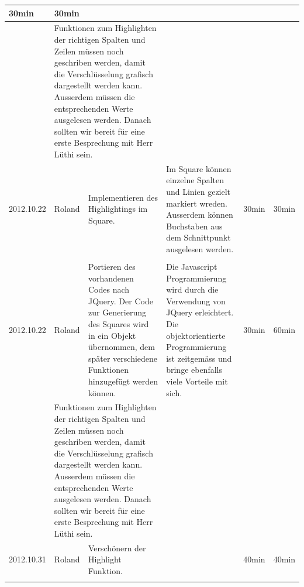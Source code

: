 \documentclass[11pt,paper=a4,final]{scrartcl}
\begin{document}
\begin{landscape}
\begin{longtable}{|p{1.8cm}|p{1.5cm}|p{5.0cm}|p{11.0cm}|l|l|}
    30min & 30min \\ \hline \nopagebreak
    \multicolumn{2}{|l|}{\bf Pendenzen} &\multicolumn{2}{p{16.0cm}|}{Funktionen zum Highlighten der richtigen Spalten und Zeilen m\"ussen noch geschriben werden, damit die Verschl\"usselung grafisch dargestellt werden kann. Ausserdem m\"ussen die entsprechenden Werte ausgelesen werden. Danach sollten wir bereit f\"ur eine erste Besprechung mit Herr L\"uthi sein.}  & \multicolumn{2}{l|}{} \\ \hline
    \hline
    2012.10.22 & Roland &
    Implementieren des Highlightings im Square.&
    Im Square k\"onnen einzelne Spalten und Linien gezielt markiert wreden. Ausserdem k\"onnen Buchstaben aus dem Schnittpunkt ausgelesen werden.&
    30min & 30min \\ \hline \nopagebreak
    \multicolumn{2}{|l|}{\bf Pendenzen} &\multicolumn{2}{p{16.0cm}|}{}  & \multicolumn{2}{l|}{} \\ \hline
    \hline
    2012.10.22 & Roland &
    Portieren des vorhandenen Codes nach JQuery. Der Code zur Generierung des Squares wird in ein Objekt \"ubernommen, dem sp\"ater verschiedene Funktionen hinzugef\"ugt werden k\"onnen.&
    Die Javascript Programmierung wird durch die Verwendung von JQuery erleichtert. Die objektorientierte Programmierung ist zeitgem\"ass und bringe ebenfalls viele Vorteile mit sich.&
    30min & 60min \\ \hline \nopagebreak
    \multicolumn{2}{|l|}{\bf Pendenzen} &\multicolumn{2}{p{16.0cm}|}{Funktionen zum Highlighten der richtigen Spalten und Zeilen m\"ussen noch geschriben werden, damit die Verschl\"usselung grafisch dargestellt werden kann. Ausserdem m\"ussen die entsprechenden Werte ausgelesen werden. Danach sollten wir bereit f\"ur eine erste Besprechung mit Herr L\"uthi sein.}  & \multicolumn{2}{l|}{} \\ \hline
    \hline
    2012.10.31 & Roland &
    Versch\"onern der Highlight Funktion.&
    &
    40min & 40min \\ \hline \nopagebreak
    \multicolumn{2}{|l|}{\bf Pendenzen} &\multicolumn{2}{p{16.0cm}|}{}  & \multicolumn{2}{l|}{} \\ \hline
  \end{longtable}
\end{landscape}
\end{document}
